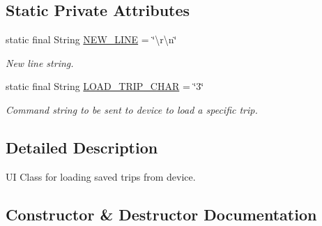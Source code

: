 \subsection*{Static Private Attributes}
\begin{DoxyCompactItemize}
\item 
\mbox{\label{classcom_1_1jack_1_1motorbikestatistics_1_1_load_device_fragment_aca212e892559df75e77d2d24870195e1}} 
static final String \hyperlink{classcom_1_1jack_1_1motorbikestatistics_1_1_load_device_fragment_aca212e892559df75e77d2d24870195e1}{N\+E\+W\+\_\+\+L\+I\+NE} = \char`\"{}\textbackslash{}r\textbackslash{}n\char`\"{}
\begin{DoxyCompactList}\small\item\em New line string. \end{DoxyCompactList}\item 
\mbox{\label{classcom_1_1jack_1_1motorbikestatistics_1_1_load_device_fragment_a484328e2963103665fae8801557bef73}} 
static final String \hyperlink{classcom_1_1jack_1_1motorbikestatistics_1_1_load_device_fragment_a484328e2963103665fae8801557bef73}{L\+O\+A\+D\+\_\+\+T\+R\+I\+P\+\_\+\+C\+H\+AR} = \char`\"{}3\char`\"{}
\begin{DoxyCompactList}\small\item\em Command string to be sent to device to load a specific trip. \end{DoxyCompactList}\end{DoxyCompactItemize}


\subsection{Detailed Description}
UI Class for loading saved trips from device. 

\subsection{Constructor \& Destructor Documentation}
\mbox{\label{classcom_1_1jack_1_1motorbikestatistics_1_1_load_device_fragment_aaa7330cd6556cd8a87e8b226d796d508}} 
